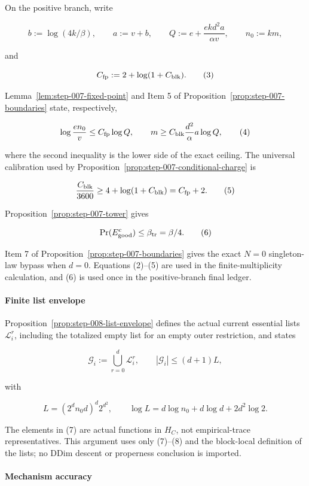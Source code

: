 On the positive branch, write

\[
 b:=\log(4k/\beta),\qquad a:=v+b,
 \qquad Q:=e+\frac{ekd^2a}{\alpha v},
 \qquad n_0:=km,
 \tag{2}
\]

and

\[
 C_{\rm fp}:=2+\log(1+C_{\rm blk}).
 \tag{3}
\]

Lemma~\ref{lem:step-007-fixed-point} and Item 5 of Proposition~\ref{prop:step-007-boundaries} state, respectively,

\[
 \log\frac{en_0}{v}\leq C_{\rm fp}\log Q,
 \qquad
 m\geq C_{\rm blk}\frac{d^2}{\alpha}a\log Q,
 \tag{4}
\]

where the second inequality is the lower side of the exact 
ceiling. The  universal calibration used by
Proposition~\ref{prop:step-007-conditional-charge} is

\[
 \frac{C_{\rm blk}}{3600}
 \geq4+\log(1+C_{\rm blk})=C_{\rm fp}+2.
 \tag{5}
\]

Proposition~\ref{prop:step-007-tower} gives

\[
 \Pr(E_{\rm good}^c)\leq\beta_{\rm tr}=\beta/4.
 \tag{6}
\]

Item 7 of Proposition~\ref{prop:step-007-boundaries} gives the
exact \(N=0\) singleton-law bypass when \(d=0\). Equations (2)--(5) are
used in the finite-multiplicity calculation, and (6) is used once in the
positive-branch final ledger.

\paragraph{Finite list envelope}

Proposition~\ref{prop:step-008-list-envelope} defines the actual
current essential lists \(\mathcal L_i^r\), including the totalized empty
list for an empty outer restriction, and states

\[
 \mathcal G_i:=\bigcup_{r=0}^d\mathcal L_i^r,
 \qquad
 |\mathcal G_i|\leq(d+1)L,
 \tag{7}
\]

with

\[
 L=(2^dn_0d)^d2^{d^2},
 \qquad
 \log L=d\log n_0+d\log d+2d^2\log2.
 \tag{8}
\]

The elements in (7) are actual functions in \(H_C\), not empirical-trace
representatives. This argument uses only (7)--(8) and the block-local definition
of the lists; no DDim descent or properness conclusion is imported.

\paragraph{Mechanism accuracy}

